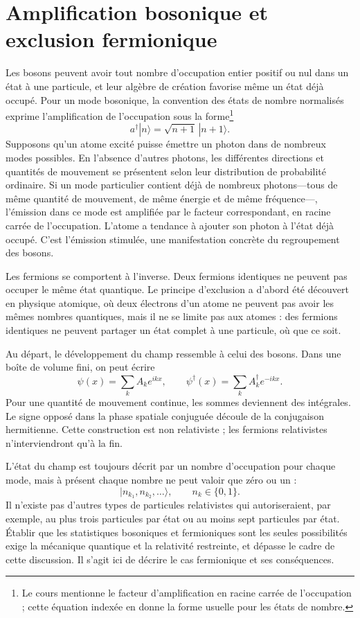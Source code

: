 \section{Amplification bosonique et exclusion fermionique}

Les bosons peuvent avoir tout nombre d’occupation entier positif ou nul dans un état à une particule, et leur algèbre de création favorise même un état déjà occupé. Pour un mode bosonique, la convention des états de nombre normalisés exprime l’amplification de l’occupation sous la forme\footnote{Le cours mentionne le facteur d’amplification en racine carrée de l’occupation ; cette équation indexée en donne la forme usuelle pour les états de nombre.}
\begin{equation}
a^\dagger|n\rangle=\sqrt{n+1}\,|n+1\rangle.
\end{equation}
Supposons qu’un atome excité puisse émettre un photon dans de nombreux modes possibles. En l’absence d’autres photons, les différentes directions et quantités de mouvement se présentent selon leur distribution de probabilité ordinaire. Si un mode particulier contient déjà de nombreux photons---tous de même quantité de mouvement, de même énergie et de même fréquence---, l’émission dans ce mode est amplifiée par le facteur correspondant, en racine carrée de l’occupation. L’atome a tendance à ajouter son photon à l’état déjà occupé. C’est l’émission stimulée, une manifestation concrète du regroupement des bosons.

Les fermions se comportent à l’inverse. Deux fermions identiques ne peuvent pas occuper le même état quantique. Le principe d’exclusion a d’abord été découvert en physique atomique, où deux électrons d’un atome ne peuvent pas avoir les mêmes nombres quantiques, mais il ne se limite pas aux atomes : des fermions identiques ne peuvent partager un état complet à une particule, où que ce soit.

Au départ, le développement du champ ressemble à celui des bosons. Dans une boîte de volume fini, on peut écrire
\begin{equation}
\psi(x)=\sum_k A_k e^{ikx},
\qquad
\psi^\dagger(x)=\sum_k A_k^\dagger e^{-ikx}.
\end{equation}
Pour une quantité de mouvement continue, les sommes deviennent des intégrales. Le signe opposé dans la phase spatiale conjuguée découle de la conjugaison hermitienne. Cette construction est non relativiste ; les fermions relativistes n’interviendront qu’à la fin.

L’état du champ est toujours décrit par un nombre d’occupation pour chaque mode, mais à présent chaque nombre ne peut valoir que zéro ou un :
\begin{equation}
|n_{k_1},n_{k_2},\ldots\rangle,
\qquad n_k\in\{0,1\}.
\end{equation}
Il n’existe pas d’autres types de particules relativistes qui autoriseraient, par exemple, au plus trois particules par état ou au moins sept particules par état. Établir que les statistiques bosoniques et fermioniques sont les seules possibilités exige la mécanique quantique et la relativité restreinte, et dépasse le cadre de cette discussion. Il s’agit ici de décrire le cas fermionique et ses conséquences.

